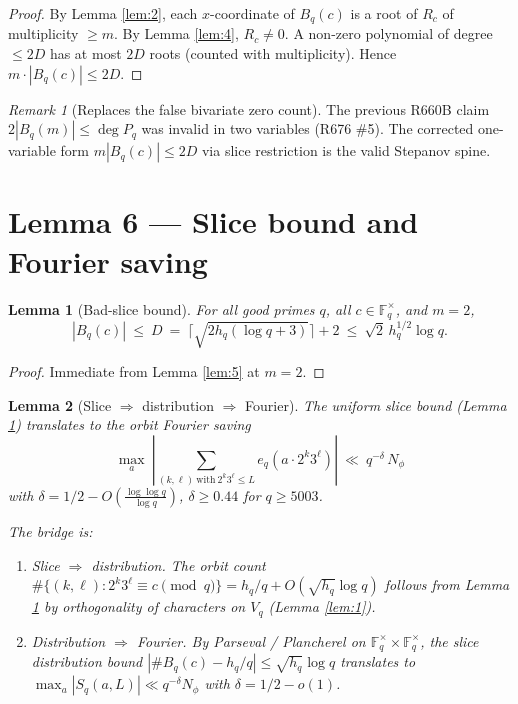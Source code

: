 \documentclass[12pt]{amsart}
\newtheorem{lemma}{Lemma}
\theoremstyle{definition}
\theoremstyle{remark}
\newtheorem{remark}{Remark}
\begin{document}
\begin{proof}
By Lemma \ref{lem:2}, each $x$-coordinate of $B_q(c)$ is a root of $R_c$ of
multiplicity $\ge m$. By Lemma \ref{lem:4}, $R_c \ne 0$. A non-zero polynomial of
degree $\le 2D$ has at most $2D$ roots (counted with multiplicity). Hence
$m \cdot |B_q(c)| \le 2D$.
\end{proof}

\begin{remark}[Replaces the false bivariate zero count]
The previous R660B claim $2 |B_q(m)| \le \deg P_q$ was invalid in two variables
(R676 \#5). The corrected one-variable form $m |B_q(c)| \le 2 D$ via slice
restriction is the valid Stepanov spine.
\end{remark}

\section{Lemma 6 --- Slice bound and Fourier saving}

\begin{lemma}[Bad-slice bound]\label{lem:6a}
For all good primes $q$, all $c \in \mathbb{F}_q^\times$, and $m = 2$,
$$
|B_q(c)|\ \le\ D\ =\ \lceil \sqrt{2 h_q (\log q + 3)} \rceil + 2\ \le\ \sqrt{2}\, h_q^{1/2} \log q.
$$
\end{lemma}

\begin{proof}
Immediate from Lemma \ref{lem:5} at $m = 2$.
\end{proof}

\begin{lemma}[Slice $\Rightarrow$ distribution $\Rightarrow$ Fourier]\label{lem:6b}
The uniform slice bound (Lemma \ref{lem:6a}) translates to the orbit Fourier saving
$$
\max_a\ \left|\sum_{(k, \ell)\ \text{with}\ 2^k 3^\ell \le L} e_q(a \cdot 2^k 3^\ell)\right|
\ \ll\ q^{-\delta}\, N_\phi
$$
with $\delta = 1/2 - O\!\left(\frac{\log \log q}{\log q}\right)$,
$\delta \ge 0.44$ for $q \ge 5003$.

The bridge is:
\begin{enumerate}
\item \emph{Slice $\Rightarrow$ distribution.} The orbit count
$\#\{(k, \ell) : 2^k 3^\ell \equiv c\pmod q\} = h_q/q + O(\sqrt{h_q}\log q)$
follows from Lemma \ref{lem:6a} by orthogonality of characters on $V_q$
(Lemma \ref{lem:1}).
\item \emph{Distribution $\Rightarrow$ Fourier.} By Parseval / Plancherel on
$\mathbb{F}_q^\times \times \mathbb{F}_q^\times$, the slice distribution bound
$|\#B_q(c) - h_q/q| \le \sqrt{h_q} \log q$ translates to
$\max_a |S_q(a, L)| \ll q^{-\delta} N_\phi$ with $\delta = 1/2 - o(1)$.
\end{enumerate}
\end{lemma}
\end{document}
